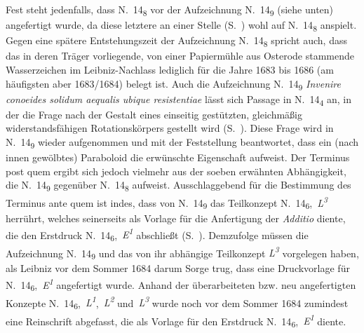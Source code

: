 Fest steht jedenfalls, dass N.~14\textsubscript{8} vor der Aufzeichnung N.~14\textsubscript{9} (siehe unten) angefertigt wurde, da diese letztere an einer Stelle (S.~) wohl auf N.~14\textsubscript{8} anspielt.
Gegen eine spätere Entstehungszeit der Aufzeichnung N.~14\textsubscript{8} spricht auch, dass das in deren Träger vorliegende, von einer Papiermühle aus Osterode\protect{} stammende Wasserzeichen im Leibniz-Nachlass lediglich für die Jahre 1683 bis 1686 (am häufigsten aber 1683/1684) belegt ist.
\pend%
\pstart%
Auch die Aufzeichnung N.~14\textsubscript{9} \textit{Invenire conoeides solidum aequalis ubique resistentiae} lässt sich 
Passage in N.~14\textsubscript{4} an, in der die Frage nach der Gestalt eines einseitig gestützten, gleichmäßig widerstandsfähigen Rotationskörpers gestellt wird (S.~).
Diese Frage wird in N.~14\textsubscript{9} wieder aufgenommen und mit der Feststellung beantwortet, dass ein (nach innen gewölbtes) Paraboloid die erwünschte Eigenschaft aufweist.
Der Terminus post quem ergibt sich jedoch vielmehr aus der soeben erwähnten Abhängigkeit, die N.~14\textsubscript{9} gegenüber N.~14\textsubscript{8} aufweist.
Ausschlaggebend für die Bestimmung des Terminus ante quem ist indes, dass von N.~14\textsubscript{9} das Teilkonzept N.~14\textsubscript{6},~\textit{L\textsuperscript{3}} herrührt, welches seinerseits als Vorlage für die Anfertigung der \textit{Additio} diente, die den Erstdruck N.~14\textsubscript{6},~\textit{E\textsuperscript{1}} abschließt (S.~).
Demzufolge müssen die Aufzeichnung 
N.~14\textsubscript{9} und das von ihr abhängige Teilkonzept \textit{L\textsuperscript{3}} vorgelegen haben, als Leibniz vor dem Sommer 1684 darum Sorge trug, dass eine Druckvorlage für N.~14\textsubscript{6},~\textit{E\textsuperscript{1}} angefertigt wurde.
\pend%
\pstart%
Anhand der überarbeiteten bzw. neu angefertigten Konzepte N.~14\textsubscript{6},~\textit{L\textsuperscript{1}},~\textit{L\textsuperscript{2}} und~\textit{L\textsuperscript{3}} wurde noch vor dem Sommer 1684 zumindest eine Reinschrift abgefasst, die als Vorlage für den Erstdruck N.~14\textsubscript{6},~\textit{E\textsuperscript{1}} diente.
